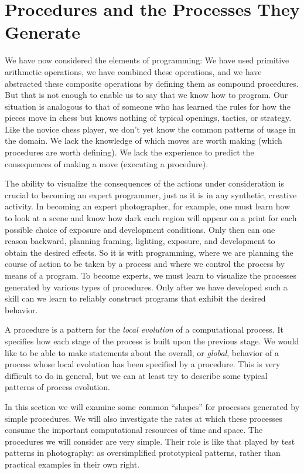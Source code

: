 \section{Procedures and the Processes They Generate}
\label{sec:1.2}


We have now considered the elements of programming: We have used
primitive arithmetic operations, we have combined these operations, and
we have abstracted these composite operations by defining them as compound
procedures.  But that is not enough to enable us to say that we know
how to program.  Our situation is analogous to that of someone who has
learned the rules for how the pieces move in chess but knows nothing
of typical openings, tactics, or strategy.  Like the novice chess
player, we don't yet know the common patterns of usage in the domain.
We lack the knowledge of which moves are worth making (which
procedures are worth defining).  We lack the experience to predict the
consequences of making a move (executing a procedure).

The ability to visualize the consequences of the actions under
consideration is crucial to becoming an expert programmer, just as it
is in any synthetic, creative activity.  In becoming an expert
photographer, for example, one must learn how to look at a scene and
know how dark each region will appear on a print for each possible
choice of exposure and development conditions.  Only then can one
reason backward, planning framing, lighting, exposure, and development
to obtain the desired effects.  So it is with programming, where we
are planning the course of action to be taken by a process and where
we control the process by means of a program.  To become experts, we
must learn to visualize the processes generated by various types of
procedures.  Only after we have developed such a skill can we learn
to reliably construct programs that exhibit the desired behavior.

A procedure is a pattern for the \textit{local evolution} of a
computational process.  It specifies how each stage of the process is
built upon the previous stage.  We would like to be able to make
statements about the overall, or \textit{global}, behavior of a
process whose local evolution has been specified by a procedure.  This
is very difficult to do in general, but we can at least try to
describe some typical patterns of process evolution.

In this section we will examine some common ``shapes'' for processes
generated by simple procedures.  We will also investigate the
rates at which these processes consume the important computational
resources of time and space.  The procedures we will consider
are very simple.  Their role is like that played by test patterns in
photography: as oversimplified prototypical patterns, rather than
practical examples in their own right.

